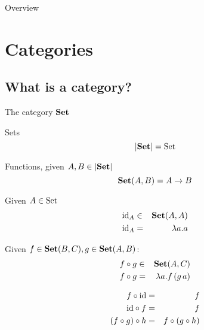 \documentclass[handout]{beamer}
\begin{document}
\begin{frame}{Overview}

  \setcounter{tocdepth}{1}
  \tableofcontents
  
\end{frame}

\section{Categories}
\label{sec:categories}

\subsection{What is a category?}

\begin{frame}

  \begin{block}{The category $\mathbf{Set}$}

  \begin{description}
  \item<+->[Objects:] Sets\vspace{-2ex} 
    \[|\mathbf{Set}| = \mathrm{Set}\]

  \item<+->[Morphisms :] Functions, given $A,B\in|\mathbf{Set}|$\vspace{-1ex} 
    \[ \mathbf{Set}(A,B) = A \to B \]

  \item<+->[Identity:] Given $A \in \mathrm{Set}$\vspace{-3ex} 
    \begin{eqnarray*}
        \mathrm{id}_A & \in & \mathbf{Set}(A,A)\\
        \mathrm{id}_A & = & \lambda a.a       
    \end{eqnarray*}

  \item<+->[Composition:]
    Given $f\in \mathbf{Set}(B,C),g\in\mathbf{Set}(A,B)$:\vspace{-1ex} 
    \begin{eqnarray*} 
      f \circ g & \in & \mathbf{Set}(A,C) \\
      f \circ g & = & \lambda a.f\,(g\,a)
    \end{eqnarray*}
  \item<+->[Laws:] \vspace{-4ex} 
    \begin{eqnarray*}
      f \circ \mathrm{id} & = & f \\
      \mathrm{id} \circ f & = & f \\
      (f \circ g) \circ h & = & f \circ (g \circ h)
    \end{eqnarray*}
  \end{description}
  \end{block}
\end{frame}
\end{document}
